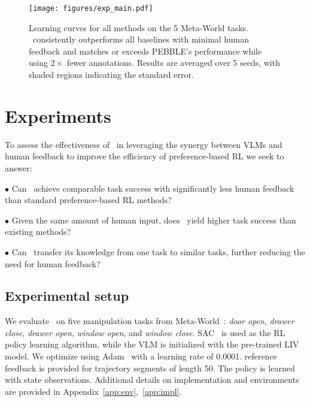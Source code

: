 \begin{figure}[t]
    \centering
    \texttt{[image: figures/exp\_main.pdf]}
    \caption{Learning curves for all methods on the 5 Meta-World tasks. \algo~consistently outperforms all baselines with minimal human feedback and matches or exceeds PEBBLE’s performance while using $2\times$ fewer annotations. Results are averaged over 5 seeds, with shaded regions indicating the standard error. 
    }
    \label{fig:exp_main}
\end{figure}
\section{Experiments} \label{sec:experiments}

To assess the effectiveness of \algo~in leveraging the synergy between VLMs and human feedback to improve the efficiency of preference-based RL we seek to answer:

$\bullet$ Can \algo~achieve comparable task success with significantly less human feedback than standard preference-based RL methods?

$\bullet$ Given the same amount of human input, does \algo~yield higher task success than existing methods?

$\bullet$ Can \algo~transfer its knowledge from one task to similar tasks, further reducing the need for human feedback?

\subsection{Experimental setup} \label{sec:exp_setup}
We evaluate \algo~on five manipulation tasks from Meta-World~\cite{yu2020meta}: \emph{door open}, \emph{drawer close}, \emph{drawer open}, \emph{window open}, and \emph{window close}. 
SAC~\cite{haarnoja2018soft} is used as the RL policy learning algorithm, while the VLM is initialized with the pre-trained LIV~\cite{ma2023liv} model. 
We optimize using Adam~\cite{kingma2014adam} with a learning rate of 0.0001. 
reference feedback is provided for trajectory segments of length 50. 
The policy is learned with state observations. 
Additional details on implementation and environments are provided in Appendix~\ref{app:env},~\ref{app:impl}.

